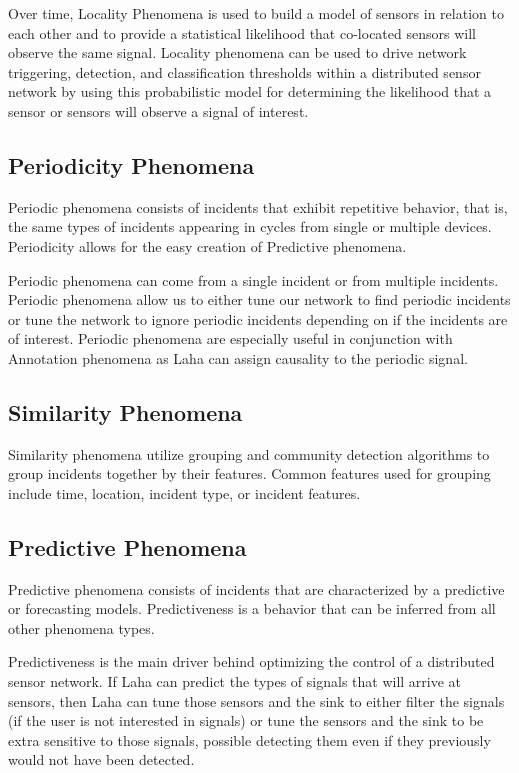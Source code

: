 Over time, Locality Phenomena is used to build a model of sensors in relation to each other and to provide a statistical likelihood that co-located sensors will observe the same signal. Locality phenomena can be used to drive network triggering, detection, and classification thresholds within a distributed sensor network by using this probabilistic model for determining the likelihood that a sensor or sensors will observe a signal of interest.

\subsection{Periodicity Phenomena} \label{periodicity-phenomena}
Periodic phenomena consists of incidents that exhibit repetitive behavior, that is, the same types of incidents appearing in cycles from single or multiple devices. Periodicity allows for the easy creation of Predictive phenomena.

Periodic phenomena can come from a single incident or from multiple incidents. Periodic phenomena allow us to either tune our network to find periodic incidents or tune the  network to ignore periodic incidents depending on if the incidents are of interest. Periodic phenomena are especially useful in conjunction with Annotation phenomena as Laha can assign causality to the periodic signal. 

\subsection{Similarity Phenomena}
Similarity phenomena utilize grouping and community detection algorithms to group incidents together by their features. Common features used for grouping include time, location, incident type, or incident features.

\subsection{Predictive Phenomena}
Predictive phenomena consists of incidents that are characterized by a predictive or forecasting models. Predictiveness is a behavior that can be inferred from all other phenomena types. 

Predictiveness is the main driver behind optimizing the control of a distributed sensor network. If Laha can predict the types of signals that will arrive at sensors, then Laha can tune those sensors and the sink to either filter the signals (if the user is not interested in signals) or tune the sensors and the sink to be extra sensitive to those signals, possible detecting them even if they previously would not have been detected.

